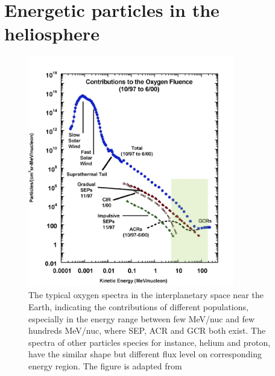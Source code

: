 \section{Energetic particles in the heliosphere}
\label{sec:particles_heliosphere}

\begin{figure}
	\centering
	\includegraphics[width = 0.8\textwidth]{images/heliospheric_particle_spectra_color.png}
	\caption[Energy spectra of oxygen ions in the near Earth space]{The typical oxygen spectra in the interplanetary space near the Earth, indicating the contributions of different populations, especially in the energy range between few MeV/nuc and few hundreds MeV/nuc, where \acs{SEP}, \acs{ACR} and \acs{GCR} both exist. The spectra of other particles species for instance, helium and proton, have the similar shape but different flux level on corresponding energy region. The figure is adapted from \citep{Mewaldt-2001}}
	\label{Fig:Oxygen_spectra_heliosphere}
\end{figure}

